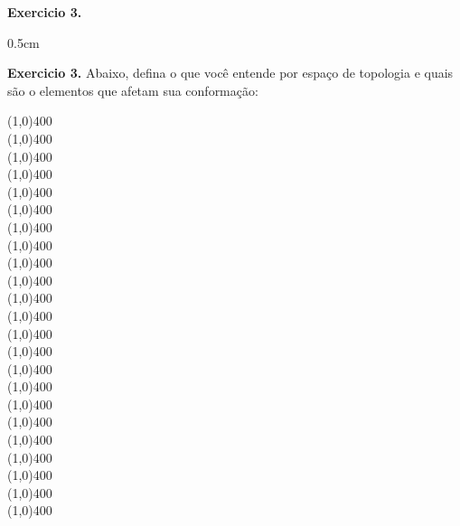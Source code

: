 \begin{refsection}
\begin{blackBlock}{\textbf{Exercicio 3.}}
\begin {myindentpar}{0.5cm}
\begin{enumerate}[\itshape i.]
\end{enumerate}
\end{myindentpar}

\end{blackBlock}

\vspace{20pt}

\begin{blackBlock}{\textbf{Exercicio 3.}}\label{tut3:ex:3.\arabic{ex}}
	Abaixo, defina o que você entende por espaço de topologia e quais são o elementos que afetam sua conformação:
  \begin{center}
  \line(1,0){400}\\
  \line(1,0){400}\\
  \line(1,0){400}\\
  \line(1,0){400}\\
  \line(1,0){400}\\
  \line(1,0){400}\\
  \line(1,0){400}\\
  \line(1,0){400}\\
  \line(1,0){400}\\
  \line(1,0){400}\\
  \line(1,0){400}\\
  \line(1,0){400}\\
  \line(1,0){400}\\
  \line(1,0){400}\\
  \line(1,0){400}\\
  \line(1,0){400}\\
  \line(1,0){400}\\
  \line(1,0){400}\\
  \line(1,0){400}\\
  \line(1,0){400}\\
  \line(1,0){400}\\
  \line(1,0){400}\\
  \line(1,0){400}\\
 
 \end{center}


\end{blackBlock}




\end{refsection}
